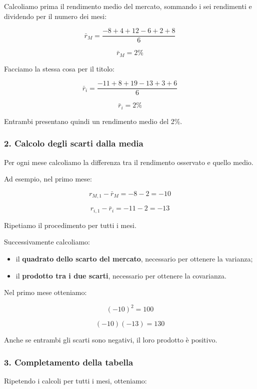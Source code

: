 \noindent Calcoliamo prima il rendimento medio
del mercato, sommando i sei rendimenti
e dividendo per il numero dei mesi:

\[
\bar{r}_M=
\frac{-8+4+12-6+2+8}{6}
\]

\[
\boxed{\bar{r}_M=2\%}
\]

\noindent Facciamo la stessa cosa
per il titolo:

\[
\bar{r}_i=
\frac{-11+8+19-13+3+6}{6}
\]

\[
\boxed{\bar{r}_i=2\%}
\]

\noindent Entrambi presentano quindi
un rendimento medio del 2\%.


\subsubsection*{2. Calcolo degli scarti dalla media}

\noindent Per ogni mese calcoliamo
la differenza tra il rendimento osservato
e quello medio.

\medskip

\noindent Ad esempio, nel primo mese:

\[
r_{M,1}-\bar{r}_M=-8-2=-10
\]

\[
r_{i,1}-\bar{r}_i=-11-2=-13
\]

\noindent Ripetiamo il procedimento
per tutti i mesi.

\medskip

\noindent Successivamente calcoliamo:

\begin{itemize}
    \item il \textbf{quadrato dello scarto del mercato},
    necessario per ottenere la varianza;

    \item il \textbf{prodotto tra i due scarti},
    necessario per ottenere la covarianza.
\end{itemize}

\noindent Nel primo mese otteniamo:

\[
(-10)^2=100
\]

\[
(-10)(-13)=130
\]

\noindent Anche se entrambi gli scarti
sono negativi, il loro prodotto è positivo.


\subsubsection*{3. Completamento della tabella}

\noindent Ripetendo i calcoli per tutti i mesi,
otteniamo:

